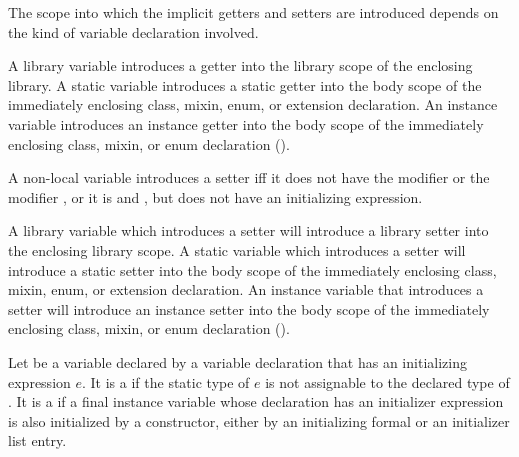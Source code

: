 \documentclass[makeidx]{article}
\begin{document}
\LMHash{}%
The scope into which the implicit getters and setters are introduced
depends on the kind of variable declaration involved.

\LMHash{}%
A library variable introduces a getter into
the library scope of the enclosing library.
A static variable introduces a static getter into
the body scope of the immediately enclosing
class, mixin, enum, or extension declaration.
An instance variable introduces an instance getter into
the body scope of the immediately enclosing
class, mixin, or enum declaration
().

\LMHash{}%
A non-local variable introduces a setter if{}f
it does not have the modifier \FINAL{} or the modifier \CONST{},
or it is \LATE{} and \FINAL, but does not have an initializing expression.

\LMHash{}%
A library variable which introduces a setter will introduce
a library setter into the enclosing library scope.
A static variable which introduces a setter will introduce
a static setter into the body scope of the immediately enclosing
class, mixin, enum, or extension declaration.
An instance variable that introduces a setter will introduce
an instance setter into the body scope of the immediately enclosing
class, mixin, or enum declaration
().

\LMHash{}%
Let \id{} be a variable declared by a variable declaration
that has an initializing expression $e$.
It is a  if the static type of $e$
is not assignable to the declared type of \id.
It is a  if a final instance variable
whose declaration has an initializer expression
is also initialized by a constructor,
either by an initializing formal or an initializer list entry.

\end{document}
